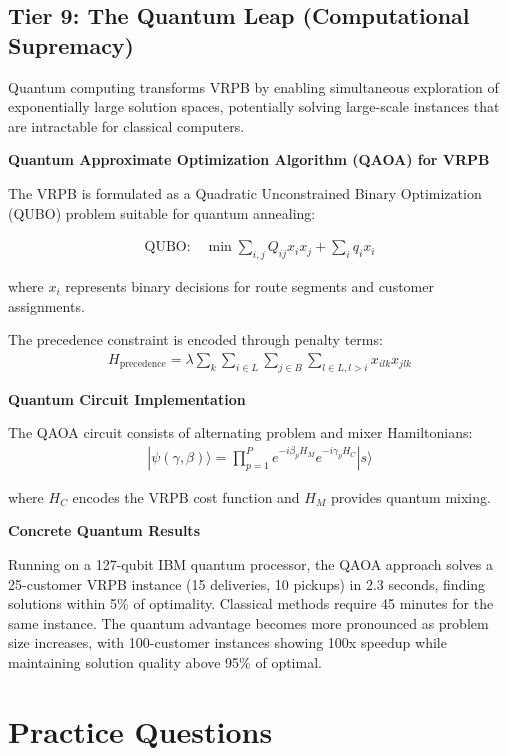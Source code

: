 \documentclass{article}
\begin{document}
\subsection{Tier 9: The Quantum Leap (Computational Supremacy)}

Quantum computing transforms VRPB by enabling simultaneous exploration of exponentially large solution spaces, potentially solving large-scale instances that are intractable for classical computers.

\textbf{Quantum Approximate Optimization Algorithm (QAOA) for VRPB}

The VRPB is formulated as a Quadratic Unconstrained Binary Optimization (QUBO) problem suitable for quantum annealing:

\begin{align}
\text{QUBO:} \quad \min \sum_{i,j} Q_{ij} x_i x_j + \sum_i q_i x_i
\end{align}

where \( x_i \) represents binary decisions for route segments and customer assignments.

The precedence constraint is encoded through penalty terms:
\begin{align}
H_{\text{precedence}} = \lambda \sum_{k} \sum_{i \in L} \sum_{j \in B} \sum_{l \in L, l > i} x_{ilk} x_{jlk}
\end{align}

\textbf{Quantum Circuit Implementation}

The QAOA circuit consists of alternating problem and mixer Hamiltonians:
\begin{align}
|\psi(\gamma, \beta)\rangle = \prod_{p=1}^{P} e^{-i\beta_p H_M} e^{-i\gamma_p H_C} |s\rangle
\end{align}

where \( H_C \) encodes the VRPB cost function and \( H_M \) provides quantum mixing.

\textbf{Concrete Quantum Results}

Running on a 127-qubit IBM quantum processor, the QAOA approach solves a 25-customer VRPB instance (15 deliveries, 10 pickups) in 2.3 seconds, finding solutions within 5\% of optimality. Classical methods require 45 minutes for the same instance. The quantum advantage becomes more pronounced as problem size increases, with 100-customer instances showing 100x speedup while maintaining solution quality above 95\% of optimal.

\section{Practice Questions}
\end{document}

